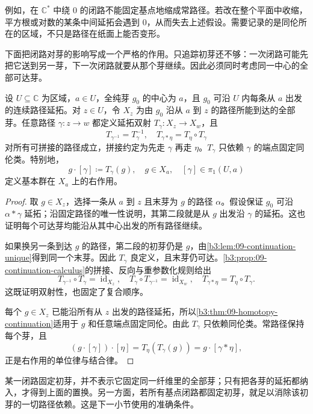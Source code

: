 \ProseParagraphBreak
例如，在 \(\mathbb C^*\) 中绕 \(0\) 的闭路不能固定基点地缩成常路径。若改在整个平面中收缩，平方根或对数的某条中间延拓会遇到 \(0\)，从而失去上述假设。需要记录的是同伦所在的区域，不只是路径在纸面上能否变形。

\ProseParagraphBreak
下面把闭路对芽的影响写成一个严格的作用。只追踪初芽还不够：一次闭路可能先把它送到另一芽，下一次闭路就要从那个芽继续。因此必须同时考虑同一中心的全部可达芽。

\begin{proposition}[可达芽纤维上的闭路右作用]\label{b3:prop:09-monodromy-action}
设 \(U\subseteq\mathbb C\) 为区域，\(a\in U\)，全纯芽 \(g_0\) 的中心为 \(a\)，且 \(g_0\) 可沿 \(U\) 内每条从 \(a\) 出发的连续路径延拓。对 \(z\in U\)，令 \(X_z\) 为由 \(g_0\) 沿从 \(a\) 到 \(z\) 的路径所能到达的全部芽。任意路径 \(\gamma:z\rightarrow w\) 都定义延拓双射 \(T_\gamma:X_z\rightarrow X_w\)，且
\[
 T_{\gamma^{-1}}=T_\gamma^{-1},\quad
 T_{\gamma*\eta}=T_\eta\circ T_\gamma
\]
对所有可拼接的路径成立，拼接约定为先走 \(\gamma\) 再走 \(\eta\)。\(T_\gamma\) 只依赖 \(\gamma\) 的端点固定同伦类。特别地，
\[
 g\cdot[\gamma]\coloneqq T_\gamma(g),\quad
 g\in X_a,\quad[\gamma]\in\pi_1(U,a)
\]
定义基本群在 \(X_a\) 上的右作用。
\end{proposition}
\begin{proof}
取 \(g\in X_z\)，选择一条从 \(a\) 到 \(z\) 且末芽为 \(g\) 的路径 \(\alpha\)。假设保证 \(g_0\) 可沿 \(\alpha*\gamma\) 延拓；沿固定路径的唯一性说明，其第二段就是从 \(g\) 出发沿 \(\gamma\) 的延拓。这也证明每个可达芽均能沿从其中心出发的所有路径继续。

如果换另一条到达 \(g\) 的路径，第二段的初芽仍是 \(g\)，由\cref{b3:lem:09-continuation-unique}得到同一个末芽。因此 \(T_\gamma\) 良定义，且末芽仍可达。\cref{b3:prop:09-continuation-calculus}的拼接、反向与重参数化规则给出
\[
 T_{\gamma^{-1}}\circ T_\gamma=\operatorname{id}_{X_z},\quad
 T_\gamma\circ T_{\gamma^{-1}}=\operatorname{id}_{X_w},\quad
 T_{\gamma*\eta}=T_\eta\circ T_\gamma.
\]
这既证明双射性，也固定了复合顺序。

每个 \(g\in X_z\) 已能沿所有从 \(z\) 出发的路径延拓，所以\cref{b3:thm:09-homotopy-continuation}适用于 \(g\) 和任意端点固定同伦。由此 \(T_\gamma\) 只依赖同伦类。常路径保持每个芽，且
\[
 (g\cdot[\gamma])\cdot[\eta]
 =T_\eta(T_\gamma(g))
 =g\cdot[\gamma*\eta],
\]
正是右作用的单位律与结合律。
\end{proof}

某一闭路固定初芽，并不表示它固定同一纤维里的全部芽；只有把各芽的延拓都纳入，才得到上面的置换。另一方面，若所有基点闭路都固定初芽，就足以消除该初芽的一切路径依赖。这是下一小节使用的准确条件。

